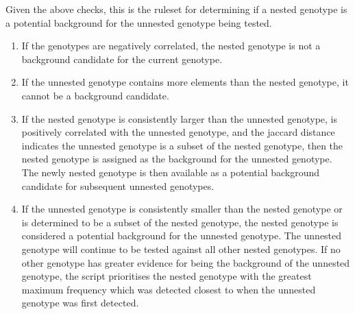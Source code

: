 \documentclass{book}
\begin{document}
Given the above checks, this is the ruleset for determining if a nested genotype is a potential background for the unnested genotype being tested.
\begin{enumerate}
\item If the genotypes are negatively correlated, the nested genotype is not a background candidate for the current genotype.
\item If the unnested genotype contains more elements than the nested genotype, it cannot be a background candidate.
\item If the nested genotype is consistently larger than the unnested genotype, is positively correlated with the unnested genotype, and the jaccard distance indicates the unnested genotype is a subset of the nested genotype, then the nested genotype is assigned as the background for the unnested genotype. The newly nested genotype is then available as a potential background candidate for subsequent unnested genotypes.
\item If the unnested genotype is consistently smaller than the nested genotype or is determined to be a subset of the nested genotype, the nested genotype is considered a potential background for the unnested genotype. The unnested genotype will continue to be tested against all other nested genotypes. If no other genotype has greater evidence for being the background of the unnested genotype, the script prioritises the nested genotype with the greatest maximum frequency which was detected closest to when the unnested genotype was first detected.
\end{enumerate}
\end{document}
